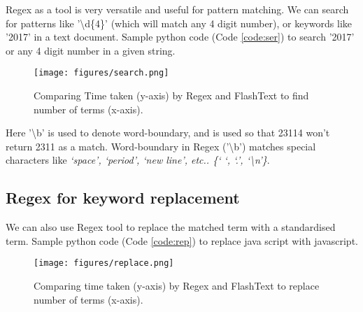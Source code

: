 Regex as a tool is very versatile and useful for pattern matching. We can search for patterns like '\textbackslash d\{4\}' (which will match any 4 digit number), or keywords like '2017' in a text document. Sample python code (Code \ref{code:ser}) to search '2017' or any 4 digit number in a given string.
\newline


\begin{figure}[H]
    \centering
    \texttt{[image: figures/search.png]}
    \caption{Comparing Time taken (y-axis) by Regex and FlashText to find number of terms (x-axis).}
    \label{fig:search}
\end{figure}

Here '\textbackslash b' is used to denote word-boundary, and is used so that 23114 won’t return 2311 as a match. Word-boundary in Regex ('\textbackslash b') matches special characters like \textit{‘space’, ‘period’, ‘new line’, etc.. \{‘ ‘, ‘.’, ‘\textbackslash n’\}}.

\subsection{Regex for keyword replacement}

We can also use Regex tool to replace the matched term with a standardised term. Sample python code (Code \ref{code:rep}) to replace java script with javascript.



\begin{figure}[H]
    \centering
    \texttt{[image: figures/replace.png]}
    \caption{Comparing time taken (y-axis) by Regex and FlashText to replace number of terms (x-axis).}
    \label{fig:replace}
\end{figure}